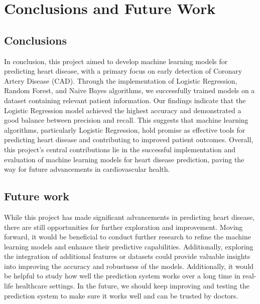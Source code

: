 \chapter{Conclusions and Future Work}
\label{ch:con}
\section{Conclusions}
In conclusion, this project aimed to develop machine learning models for predicting heart disease, with a primary focus on early detection of Coronary Artery Disease (CAD). Through the implementation of Logistic Regression, Random Forest, and Naive Bayes algorithms, we successfully trained models on a dataset containing relevant patient information. Our findings indicate that the Logistic Regression model achieved the highest accuracy and demonstrated a good balance between precision and recall. This suggests that machine learning algorithms, particularly Logistic Regression, hold promise as effective tools for predicting heart disease and contributing to improved patient outcomes. Overall, this project's central contributions lie in the successful implementation and evaluation of machine learning models for heart disease prediction, paving the way for future advancements in cardiovascular health.

\section{Future work}
While this project has made significant advancements in predicting heart disease, there are still opportunities for further exploration and improvement. Moving forward, it would be beneficial to conduct further research to refine the machine learning models and enhance their predictive capabilities. Additionally, exploring the integration of additional features or datasets could provide valuable insights into improving the accuracy and robustness of the models. Additionally, it would be helpful to study how well the prediction system works over a long time in real-life healthcare settings. In the future, we should keep improving and testing the prediction system to make sure it works well and can be trusted by doctors.